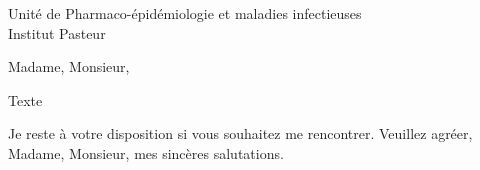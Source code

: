 \documentclass[a4paper,10pt]{lettre}
\makeatletter
\newcommand*{\NoRule}{\renewcommand*{\rule@length}{0}}
\makeatother
\begin{document}

\begin{letter}{Unit\'e de Pharmaco-\'epid\'emiologie et maladies infectieuses\\
Institut Pasteur} %
\NoRule
\openingspace=3pt
\sigspace=0pt

\address{H\'el\`ene Arduin\\
3 cours de la Lib\'eration\\
38100 Grenoble}
\nofax



\opening{Madame, Monsieur,}

Texte

\closing{Je reste \`a votre disposition si vous souhaitez me rencontrer. Veuillez agr\'eer, Madame, Monsieur, mes sinc\`eres salutations.}

\signature{H\'el\`ene Arduin}


\end{letter}
\end{document}

